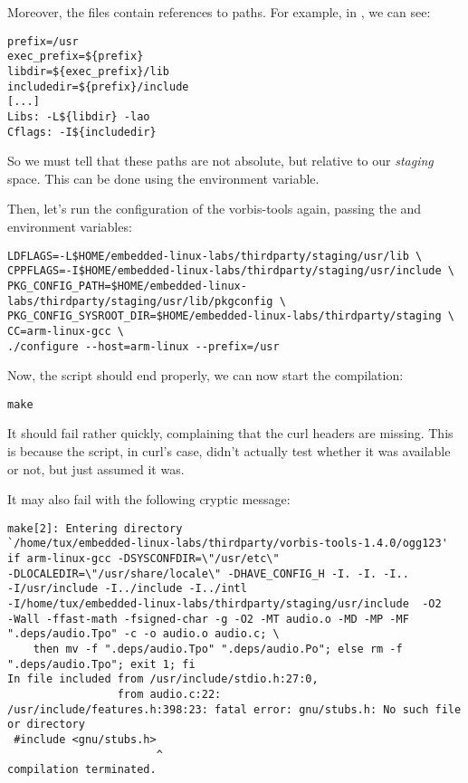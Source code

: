 Moreover, the  files contain references to paths. For
example, in
,
we can see:

\begin{verbatim}
prefix=/usr
exec_prefix=${prefix}
libdir=${exec_prefix}/lib
includedir=${prefix}/include
[...]
Libs: -L${libdir} -lao
Cflags: -I${includedir}
\end{verbatim}

So we must tell  that these paths are not absolute,
but relative to our {\em staging} space. This can be done using the
 environment variable.

Then, let's run the configuration of the vorbis-tools again, passing
the  and 
environment variables:

\small
\begin{verbatim}
LDFLAGS=-L$HOME/embedded-linux-labs/thirdparty/staging/usr/lib \
CPPFLAGS=-I$HOME/embedded-linux-labs/thirdparty/staging/usr/include \
PKG_CONFIG_PATH=$HOME/embedded-linux-labs/thirdparty/staging/usr/lib/pkgconfig \
PKG_CONFIG_SYSROOT_DIR=$HOME/embedded-linux-labs/thirdparty/staging \
CC=arm-linux-gcc \
./configure --host=arm-linux --prefix=/usr
\end{verbatim}
\normalsize

Now, the  script should end properly, we can now start the
compilation:
\begin{verbatim}
make
\end{verbatim}

It should fail rather quickly, complaining that the curl headers are
missing. This is because the  script, in curl's case, didn't
actually test whether it was available or not, but just assumed it was.

It may also fail with the following cryptic message:
\footnotesize
\begin{verbatim}
make[2]: Entering directory
`/home/tux/embedded-linux-labs/thirdparty/vorbis-tools-1.4.0/ogg123'
if arm-linux-gcc -DSYSCONFDIR=\"/usr/etc\"
-DLOCALEDIR=\"/usr/share/locale\" -DHAVE_CONFIG_H -I. -I. -I..
-I/usr/include -I../include -I../intl
-I/home/tux/embedded-linux-labs/thirdparty/staging/usr/include  -O2
-Wall -ffast-math -fsigned-char -g -O2 -MT audio.o -MD -MP -MF
".deps/audio.Tpo" -c -o audio.o audio.c; \
	then mv -f ".deps/audio.Tpo" ".deps/audio.Po"; else rm -f
".deps/audio.Tpo"; exit 1; fi
In file included from /usr/include/stdio.h:27:0,
                 from audio.c:22:
/usr/include/features.h:398:23: fatal error: gnu/stubs.h: No such file
or directory
 #include <gnu/stubs.h>
                       ^
compilation terminated.
\end{verbatim}
\normalsize

